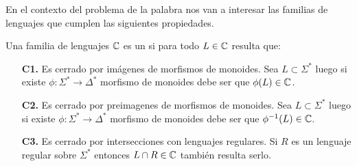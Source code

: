 \documentclass[tesis.tex]{subfiles}
\begin{document}
En el contexto del problema de la palabra nos van a interesar las familias de lenguajes que cumplen las siguientes propiedades.
\medskip
\begin{deff}
	Una familia de lenguajes $\mathbb{C}$ es un  si para todo $L \in \mathbb{C}$ resulta que:
	\begin{itemize}
		\item[\textbf{C1.}] Es cerrado por imágenes de morfismos de monoides. Sea $L \subset \Sigma^*$ luego si existe $\phi:\Sigma^* \to \Delta^*$ morfismo de monoides debe ser que $\phi(L) \in \mathbb{C}$.
		\item[\textbf{C2.}] Es cerrado por preimagenes de morfismos de monoides. Sea $L \subset \Sigma^*$ luego si existe $\phi:\Sigma^* \to \Delta^*$ morfismo de monoides  debe ser que $\phi^{-1}(L) \in \mathbb{C}$. 
		\item[\textbf{C3.}] Es cerrado por intersecciones con lenguajes regulares. Si $R$ es un lenguaje regular sobre $\Sigma^*$ entonces $L \cap R \in \mathbb{C}$ también resulta serlo.
	\end{itemize}
\end{deff} 
\end{document}
